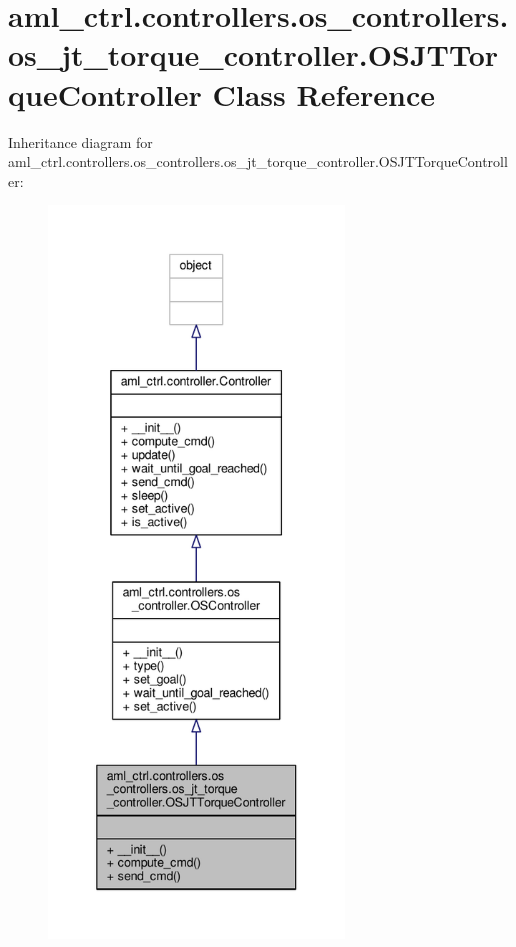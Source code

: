 \hypertarget{classaml__ctrl_1_1controllers_1_1os__controllers_1_1os__jt__torque__controller_1_1_o_s_j_t_torque_controller}{\section{aml\-\_\-ctrl.\-controllers.\-os\-\_\-controllers.\-os\-\_\-jt\-\_\-torque\-\_\-controller.\-O\-S\-J\-T\-Torque\-Controller Class Reference}
\label{classaml__ctrl_1_1controllers_1_1os__controllers_1_1os__jt__torque__controller_1_1_o_s_j_t_torque_controller}
}


Inheritance diagram for aml\-\_\-ctrl.\-controllers.\-os\-\_\-controllers.\-os\-\_\-jt\-\_\-torque\-\_\-controller.\-O\-S\-J\-T\-Torque\-Controller\-:
\nopagebreak
\begin{figure}[H]
\begin{center}
\leavevmode
\includegraphics[height=550pt]{classaml__ctrl_1_1controllers_1_1os__controllers_1_1os__jt__torque__controller_1_1_o_s_j_t_torque_controller__inherit__graph}
\end{center}
\end{figure}


